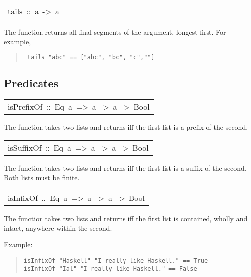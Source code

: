 \begin{haddockdesc}
\item[\begin{tabular}{@{}l}
tails\ ::\ {\char 91}a{\char 93}\ ->\ {\char 91}{\char 91}a{\char 93}{\char 93}
\end{tabular}]\haddockbegindoc
The  function returns all final segments of the argument,
 longest first.  For example,
\par
\begin{quote}
{\haddockverb\begin{verbatim}
 tails "abc" == ["abc", "bc", "c",""]
\end{verbatim}}
\end{quote}

\end{haddockdesc}
\subsection{Predicates
}
\begin{haddockdesc}
\item[\begin{tabular}{@{}l}
isPrefixOf\ ::\ Eq\ a\ =>\ {\char 91}a{\char 93}\ ->\ {\char 91}a{\char 93}\ ->\ Bool
\end{tabular}]\haddockbegindoc
The  function takes two lists and returns 
 iff the first list is a prefix of the second.
\par

\end{haddockdesc}
\begin{haddockdesc}
\item[\begin{tabular}{@{}l}
isSuffixOf\ ::\ Eq\ a\ =>\ {\char 91}a{\char 93}\ ->\ {\char 91}a{\char 93}\ ->\ Bool
\end{tabular}]\haddockbegindoc
The  function takes two lists and returns 
 iff the first list is a suffix of the second.
 Both lists must be finite.
\par

\end{haddockdesc}
\begin{haddockdesc}
\item[\begin{tabular}{@{}l}
isInfixOf\ ::\ Eq\ a\ =>\ {\char 91}a{\char 93}\ ->\ {\char 91}a{\char 93}\ ->\ Bool
\end{tabular}]\haddockbegindoc
The  function takes two lists and returns 
 iff the first list is contained, wholly and intact,
 anywhere within the second.
\par
Example:
\par
\begin{quote}
{\haddockverb\begin{verbatim}
isInfixOf "Haskell" "I really like Haskell." == True
isInfixOf "Ial" "I really like Haskell." == False
\end{verbatim}}
\end{quote}

\end{haddockdesc}
